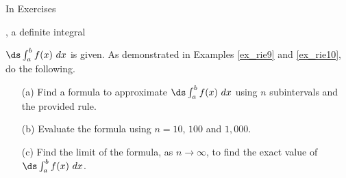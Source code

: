 {\noindent In Exercises}
{, a definite integral 

$\ds \int_a^b f(x) \ dx$ is given. As demonstrated in Examples \ref{ex_rie9} and \ref{ex_rie10}, do the following.
\begin{enumerate}
\item[(a)]		Find a formula to approximate $\ds \int_a^bf(x)\ dx$ using $n$ subintervals and the provided rule.
\item[(b)]		Evaluate the formula using $n=10$, $100$ and $1,000$. 
\item[(c)]		Find the limit of the formula, as $n\to \infty$, to find the exact value of $\ds \int_a^bf(x)\ dx$.
\end{enumerate}
}
